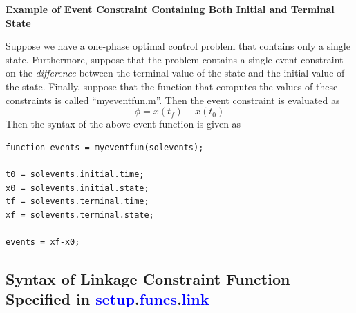 \documentclass[10pt]{article}
\newenvironment{shadedframe}{%
  \def\FrameCommand{\fcolorbox{black}{shadecolor}}%
  \MakeFramed {\FrameRestore}}
{\endMakeFramed}
\newcommand{\bfblue}[1]{\textcolor{blue}{\bf #1}}
\begin{document}
\scriptsize
\begin{shadedframe}
{\noindent}{\bf Example of Event Constraint Containing Both Initial and Terminal State}
\vspace{12pt}

{\noindent}Suppose we have a one-phase optimal control problem that contains
only a single state.  Furthermore, suppose that the problem contains a single
event constraint on the {\em difference} between the terminal value of the
state and the initial value of the state.  Finally, suppose that the function
that computes the values of these constraints is called ``myeventfun.m''.
Then the event constraint is evaluated as
\begin{displaymath}
  \phi = x(t_f)-x(t_0)
\end{displaymath}
Then the syntax of the above event function is given as
\begin{verbatim}
function events = myeventfun(solevents);

t0 = solevents.initial.time;
x0 = solevents.initial.state;
tf = solevents.terminal.time;
xf = solevents.terminal.state;

events = xf-x0;
\end{verbatim}
\end{shadedframe}
\normalsize

\subsection{Syntax of Linkage Constraint Function Specified in \bfblue{setup}.\bfblue{funcs}.\bfblue{link}\label{sect:linkSyntax}}
\end{document}
